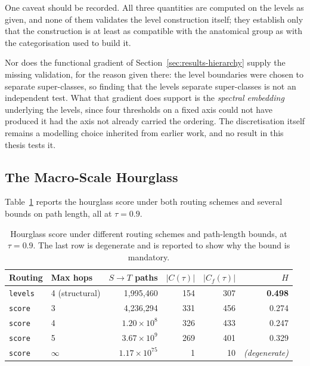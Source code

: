 \documentclass[12pt,a4paper,oneside]{article}
\theoremstyle{definition}
\theoremstyle{plain}
\newcommand{\code}[1]{\texttt{#1}}
\begin{document}
One caveat should be recorded. All three quantities are computed on the
levels as given, and none of them validates the level construction itself;
they establish only that the construction is at least as compatible with the
anatomical group as with the categorisation used to build it.

Nor does the functional gradient of Section~\ref{sec:results-hierarchy}
supply the missing validation, for the reason given there: the level
boundaries were chosen to separate super-classes, so finding that the levels
separate super-classes is not an independent test. What that gradient does
support is the \emph{spectral embedding} underlying the levels, since four
thresholds on a fixed axis could not have produced it had the axis not
already carried the ordering. The discretisation itself remains a modelling
choice inherited from earlier work, and no result in this thesis tests it.

\subsection{The Macro-Scale Hourglass}
\label{sec:results-macro}

Table~\ref{tab:hscore} reports the hourglass score under both routing
schemes and several bounds on path length, all at $\tau = 0.9$.

\begin{table}[H]
\centering
\caption{Hourglass score under different routing schemes and path-length
bounds, at $\tau = 0.9$. The last row is degenerate and is reported to show
why the bound is mandatory.}
\label{tab:hscore}
\begin{tabular}{llrrrr}
\toprule
Routing & Max hops & $S \to T$ paths & $|C(\tau)|$ & $|C_f(\tau)|$ & $H$ \\
\midrule
\code{levels} & 4 (structural) & 1,995,460   & 154 & 307 & \textbf{0.498} \\
\code{score}  & 3              & 4,236,294   & 331 & 456 & 0.274 \\
\code{score}  & 4              & $1.20\times10^{8}$ & 326 & 433 & 0.247 \\
\code{score}  & 5              & $3.67\times10^{9}$ & 269 & 401 & 0.329 \\
\code{score}  & $\infty$       & $1.17\times10^{75}$ & 1 & 10 & \emph{(degenerate)} \\
\bottomrule
\end{tabular}
\end{table}
\end{document}
